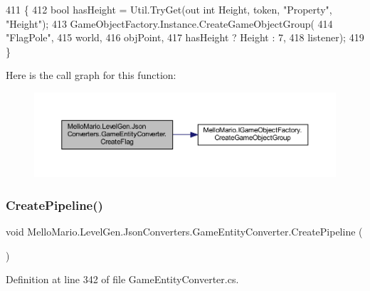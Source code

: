 \begin{DoxyCode}
411         \{
412             \textcolor{keywordtype}{bool} hasHeight = Util.TryGet(out \textcolor{keywordtype}{int} Height, token, \textcolor{stringliteral}{"Property"}, \textcolor{stringliteral}{"Height"});
413             GameObjectFactory.Instance.CreateGameObjectGroup(
414                 \textcolor{stringliteral}{"FlagPole"},
415                 world,
416                 objPoint,
417                 hasHeight ? Height : 7,
418                 listener);
419         \}
\end{DoxyCode}
Here is the call graph for this function\+:
\nopagebreak
\begin{figure}[H]
\begin{center}
\leavevmode
\includegraphics[width=350pt]{classMelloMario_1_1LevelGen_1_1JsonConverters_1_1GameEntityConverter_adf9736309b65eaa7eaf68072201db239_cgraph}
\end{center}
\end{figure}
\mbox{\label{classMelloMario_1_1LevelGen_1_1JsonConverters_1_1GameEntityConverter_a078693ba39b06cb636e8d8cb0193a4a5}} 
\subsubsection{Create\+Pipeline()}
{\footnotesize\ttfamily void Mello\+Mario.\+Level\+Gen.\+Json\+Converters.\+Game\+Entity\+Converter.\+Create\+Pipeline (\begin{DoxyParamCaption}{ }\end{DoxyParamCaption})\hspace{0.3cm}{\ttfamily [private]}}



Definition at line 342 of file Game\+Entity\+Converter.\+cs.



